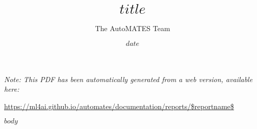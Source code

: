 \documentclass[article, 12pt, oneside]{memoir}
\title{$title$}
\author{The AutoMATES Team}
\date{$date$}
\begin{document}
\maketitle
\tableofcontents*

\bigskip
\bigskip

\noindent \emph{Note: This PDF has been automatically generated from a web
  version, available here:}

  {
  \small
\noindent \url{https://ml4ai.github.io/automates/documentation/reports/$reportname$}
}

$body$
\end{document}
